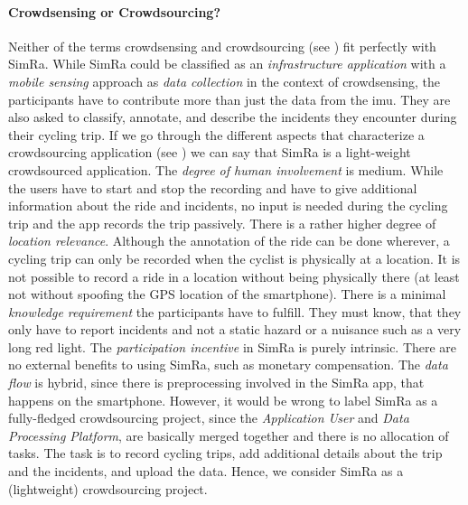 \paragraph{Crowdsensing or Crowdsourcing?}
Neither of the terms crowdsensing and crowdsourcing (see ) fit perfectly with SimRa.
While SimRa could be classified as an \textit{infrastructure application} with a \textit{mobile sensing} approach as \textit{data collection} in the context of crowdsensing, the participants have to contribute more than just the data from the \ac{imu}.
They are also asked to classify, annotate, and describe the incidents they encounter during their cycling trip.
If we go through the different aspects that characterize a crowdsourcing application (see ) we can say that SimRa is a light-weight crowdsourced application.
The \textit{degree of human involvement} is medium.
While the users have to start and stop the recording and have to give additional information about the ride and incidents, no input is needed during the cycling trip and the app records the trip passively.
There is a rather higher degree of \textit{location relevance}.
Although the annotation of the ride can be done wherever, a cycling trip can only be recorded when the cyclist is physically at a location.
It is not possible to record a ride in a location without being physically there (at least not without spoofing the GPS location of the smartphone).
There is a minimal \textit{knowledge requirement} the participants have to fulfill.
They must know, that they only have to report incidents and not a static hazard or a nuisance such as a very long red light.
The \textit{participation incentive} in SimRa is purely intrinsic.
There are no external benefits to using SimRa, such as monetary compensation.
The \textit{data flow} is hybrid, since there is preprocessing involved in the SimRa app, that happens on the smartphone.
However, it would be wrong to label SimRa as a fully-fledged crowdsourcing project, since the \textit{Application User} and \textit{Data Processing Platform}, are basically merged together and there is no allocation of tasks.
The task is to record cycling trips, add additional details about the trip and the incidents, and upload the data.
Hence, we consider SimRa as a (lightweight) crowdsourcing project.

